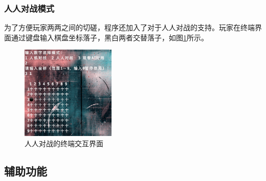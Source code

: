 \documentclass[twocolumn]{article}
\begin{document}
\subsubsection{人人对战模式}
为了方便玩家两两之间的切磋，程序还加入了对于人人对战的支持。玩家在终端界面通过键盘输入棋盘坐标落子，黑白两者交替落子，如图\ref{Fig5}所示。
\begin{figure}[H]
\centering
\includegraphics[width=0.4\textwidth]{fig7}
\caption{人人对战的终端交互界面}
\label{Fig5}
\end{figure}
\subsection{辅助功能}
\end{document}
